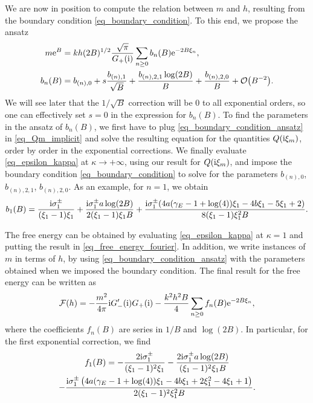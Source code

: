 \documentclass[a4paper,11pt]{article}
\theoremstyle{definition}
\newcommand{\re}{{\rm e}}
\newcommand{\ri}{{\rm i}}
\begin{document}
We are now in position to compute the relation between $m$ and $h$, resulting from the boundary condition \eqref{eq_boundary_condition}. To this end, we propose the ansatz
\begin{equation}
\begin{aligned}
m\re^B &= kh (2B)^{1/2} \frac{\sqrt{\pi}}{G_+(\ri)} \sum_{n\ge 0} b_n (B) \re^{-2B\xi_n},\\
b_{n}(B) &= b_{(n),0} + s\frac{b_{(n),1}}{\sqrt{B}} + \frac{b_{(n),2,1} \log(2B)}{B} + \frac{b_{(n),2,0}}{B} + \mathcal{O}\big(B^{-2}\big).
\end{aligned}
\label{eq_boundary_condition_ansatz}
\end{equation}
We will see later that the $1/\sqrt{B}$ correction will be 0 to all exponential orders, so one can effectively set $s=0$ in the expression for $b_n(B)$. To find the parameters in the ansatz of $b_n(B)$, we first have to plug \eqref{eq_boundary_condition_ansatz} in \eqref{eq_Qm_implicit} and solve the resulting equation for the quantities $Q(\ri\xi_m)$, order by order in the exponential corrections. We finally evaluate \eqref{eq_epsilon_kappa} at $\kappa\rightarrow +\infty$, using our result for $Q(\ri\xi_m)$, and  impose the boundary condition \eqref{eq_boundary_condition} to solve for the parameters $b_{(n),0}$, $b_{(n),2,1}$, $b_{(n),2,0}$. As an example, for $n=1$, we obtain
\begin{equation}
b_1(B) = \frac{\ri \sigma^\pm_1}{(\xi_1 -1)\xi_1} + \frac{\ri \sigma^\pm_1 a \log(2B)}{2(\xi_1 - 1)\xi_1 B} +
\frac{\ri \sigma^\pm_1 (4 a (\gamma_E -1+\log (4))\xi_1 -4 b \xi_1-5 \xi_1+2)}{8 (\xi_1-1) \xi_1^2 B}.
\end{equation}

The free energy can be obtained by evaluating \eqref{eq_epsilon_kappa} at $\kappa=1$ and putting the result in \eqref{eq_free_energy_fourier}. In addition, we write instances of $m$ in terms of $h$, by using \eqref{eq_boundary_condition_ansatz} with the parameters obtained when we imposed the boundary condition. The final result for the free energy can be written as
\begin{equation}
\mathcal{F}(h) = - \frac{m^2}{4\pi}\ri G_-'(\ri)G_+(\ri) - \frac{k^2 h^2 B}{4} \sum_{n\ge 0} f_n(B) \re^{-2B\xi_n},
\label{eq_free_energy_transseries_B}
\end{equation}
where the coefficients $f_n(B)$ are series in $1/B$ and $\log(2B)$. In particular, for the first exponential correction, we find
\begin{multline}
f_1(B) = -\frac{2\ri \sigma^\pm_1}{(\xi_1-1)^2 \xi_1} - \frac{2\ri\sigma^\pm_1 a \log(2B)}{(\xi_1-1)^2 \xi_1 B}\\
-\frac{\ri \sigma^\pm_1 \left(4 a (\gamma_E -1+\log (4))\xi_1 -4 b \xi_1+2 \xi_1^2-4 \xi_1+1\right)}{2 (\xi_1-1)^2 \xi_1^2 B}.
\end{multline}
\end{document}
